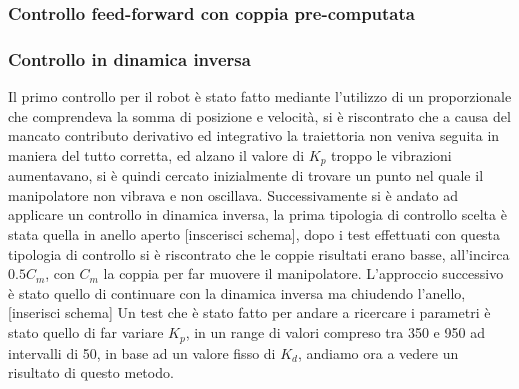 \subsubsection{Controllo feed-forward con coppia pre-computata}
\subsubsection{Controllo in dinamica inversa}
Il primo controllo per il robot è stato fatto mediante l'utilizzo di un proporzionale che comprendeva la somma di posizione e velocità, si è riscontrato che a causa del mancato contributo derivativo ed integrativo la traiettoria non veniva seguita in maniera del tutto corretta, ed alzano il valore di $K_p$ troppo le vibrazioni aumentavano, si è quindi cercato inizialmente di trovare un punto nel quale il manipolatore non vibrava e non oscillava. Successivamente si è andato ad applicare un controllo in dinamica inversa, la prima tipologia di controllo scelta è stata quella in anello aperto [inscerisci schema], dopo i test effettuati con questa tipologia di controllo si è riscontrato che le coppie risultati erano basse, all'incirca $0.5 C_m$, con $C_m$ la coppia per far muovere il manipolatore. L'approccio successivo è stato quello di continuare con la dinamica inversa ma chiudendo l'anello, [inserisci schema]
Un test che è stato fatto per andare a ricercare i parametri è stato quello di far variare $K_p$, in un range di valori compreso tra 350 e 950 ad intervalli di 50, in base ad un valore fisso di $K_d$, andiamo ora a vedere un risultato di questo metodo.
